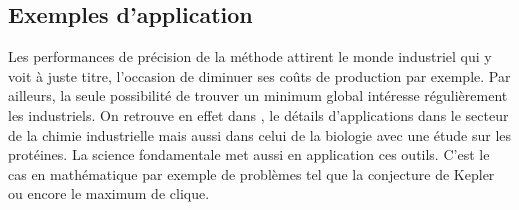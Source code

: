 \subsection{Exemples d'application}
Les performances de précision de la méthode attirent le monde industriel qui y voit à juste titre, l'occasion de diminuer ses coûts de production par exemple. Par ailleurs, la seule possibilité de trouver un minimum global intéresse régulièrement les industriels. On retrouve en effet dans \cite{Schichl}, le détails d'applications dans le secteur de la chimie industrielle mais aussi dans celui de la biologie avec une étude sur les protéines.
 La science fondamentale met aussi en application ces outils. C'est le cas en mathématique par exemple de problèmes tel que la conjecture de Kepler ou encore le  maximum de clique.
